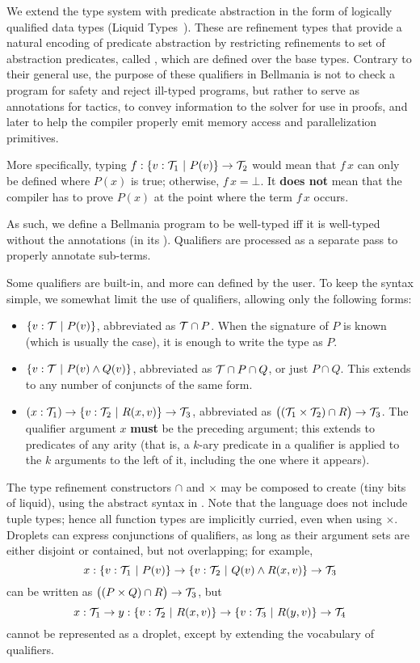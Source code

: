 We extend the type system with predicate abstraction in the form of logically qualified data types 
(Liquid Types~\cite{PLDI08/Rondon}). 
These are refinement types that provide a natural encoding of predicate abstraction
by restricting refinements to set of abstraction predicates,
called , which are defined over the base types.
Contrary to their general use, the purpose of these qualifiers in Bellmania is not to
check a program for safety and reject ill-typed programs, but rather to serve as annotations for
tactics, to convey information to the solver for use in proofs, and later to help the compiler
properly emit memory access and parallelization primitives.

More specifically, typing $f : \{v:\mathcal{T}_1 ~|~ P(v)\}\to\mathcal{T}_2$ would mean that $f\,x$
can only be defined where $P(x)$ is true; otherwise, $f\,x=\bot$. 
It {\bf does not} mean that the compiler has to prove $P(x)$ at the point where the term $f\,x$
occurs.

As such, we define a Bellmania program to be well-typed iff it is well-typed
without the annotations (in its ). Qualifiers are processed
as a separate pass to properly annotate sub-terms.

Some qualifiers are built-in, and more can defined by the user. To keep the syntax simple, we somewhat
limit the use of qualifiers, allowing only the following forms:

\begin{itemize}
  \item $\{v:\mathcal{T} ~|~ P(v)\}$, abbreviated as $\mathcal{T}\cap P$. When the signature of $P$ is known (which is
  usually the case), it is enough to write the type as $P$.
  \item $\{v:\mathcal{T} ~|~ P(v)\land Q(v)\}$, abbreviated as $\mathcal{T}\cap P\cap Q$, or just $P\cap Q$. This extends
  to any number of conjuncts of the same form.
  \item $(x : \mathcal{T}_1) \to \{v:\mathcal{T}_2 ~|~ R(x,v)\} \to \mathcal{T}_3$, abbreviated as $\big((\mathcal{T}_1\times\mathcal{T}_2)\cap R\big)\to\mathcal{T}_3$.
  The qualifier argument $x$ {\bf must} be the preceding argument; this extends to predicates of
  any arity (that is, a $k$-ary predicate in a qualifier is applied to the $k$
  arguments to the left of it, including the one where it appears).
\end{itemize}


\medskip  
The type refinement constructors $\cap$ and $\times$ may be composed to create  (tiny bits of liquid),
using the abstract syntax in .
Note that the language does not include tuple types; hence all function types are
implicitly curried, even when using $\times$.
Droplets can express conjunctions of qualifiers,
as long as their argument sets are either disjoint or contained, but not overlapping;
for example, \[x:\{v:\mathcal{T}_1~|~P(v)\}\to \{v:\mathcal{T}_2~|~Q(v)\land R(x,v)\}\to\mathcal{T}_3\] can be written as
$\big((P\times Q)\cap R\big)\to\mathcal{T}_3$, but \[x:\mathcal{T}_1\to y:\{v:\mathcal{T}_2~|~R(x,v)\} \to \{v:\mathcal{T}_3~|~R(y,v)\}\to\mathcal{T}_4\]
cannot be represented as a droplet, except by extending the vocabulary of qualifiers.


